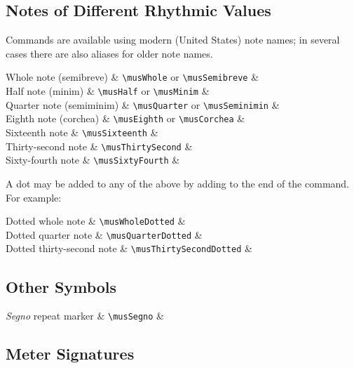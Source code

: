 \documentclass{article}
\begin{document}
\subsection{Notes of Different Rhythmic Values}

Commands are available using modern (United States) note names; in several
cases there are also aliases for older note names.

\begin{codetable}
    Whole note (semibreve) & \verb|\musWhole| or \verb|\musSemibreve| &
    \musWhole\\
    Half note (minim) & \verb|\musHalf| or \verb|\musMinim| & \musHalf\\
    Quarter note (semiminim) & \verb|\musQuarter| or \verb|\musSeminimin| &
    \musQuarter\\
    Eighth note (corchea) & \verb|\musEighth| or \verb|\musCorchea| &
    \musEighth\\
    Sixteenth note & \verb|\musSixteenth| & \musSixteenth\\
    Thirty-second note & \verb|\musThirtySecond| & \musThirtySecond\\
    Sixty-fourth note & \verb|\musSixtyFourth| & \musSixtyFourth\\
\end{codetable}

A dot may be added to any of the above by adding  to the end of the
command. For example:

\begin{codetable}
    Dotted whole note & \verb|\musWholeDotted| & \musWholeDotted\\
    Dotted quarter note & \verb|\musQuarterDotted| & \musQuarterDotted\\
    Dotted thirty-second note & \verb|\musThirtySecondDotted| &
    \musThirtySecondDotted\\
\end{codetable}

\subsection{Other Symbols}

\begin{codetable}
    \emph{Segno} repeat marker & \verb|\musSegno| & \musSegno \\
\end{codetable}

\subsection{Meter Signatures}
\end{document}
